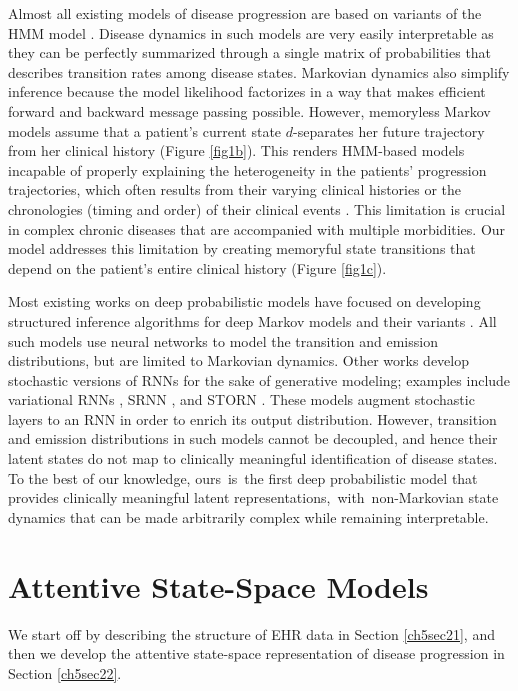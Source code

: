 \documentclass [PhD] {uclathes}
\begin{document}
Almost all existing models of disease progression are based on variants of the HMM model \cite{wang2014unsupervised,liu2015efficient,alaa2017learning}. Disease dynamics in such models are very easily interpretable as they can be perfectly summarized through a single matrix of probabilities that describes transition rates among disease states. Markovian dynamics also simplify inference because the model likelihood factorizes in a way that makes efficient forward and backward message passing possible. However, memoryless Markov models assume that a patient's current state $d$-separates her future trajectory from her clinical history (Figure \ref{fig1b}). This renders HMM-based models incapable of properly explaining the heterogeneity in the patients' progression trajectories, which often results from their varying clinical histories or the chronologies (timing and order) of their clinical events \cite{valderas2009defining}. This limitation is crucial in complex chronic diseases that are accompanied with multiple morbidities. Our model addresses this limitation by creating memoryful state transitions that depend on the patient's entire clinical history (Figure \ref{fig1c}).

Most existing works on deep probabilistic models have focused on developing structured inference algorithms for deep Markov models and their variants \cite{krishnan2017structured,dai2016recurrent,karl2016deep,johnson2016composing,rangapuram2018deep}. All such models use neural networks to model the transition and emission distributions, but are limited to Markovian dynamics. Other works develop stochastic versions of RNNs for the sake of generative modeling; examples include variational RNNs \cite{chung2015recurrent}, SRNN \cite{fraccaro2016sequential}, and STORN \cite{bayer2014learning}. These models augment stochastic layers to an RNN in order to enrich its output distribution. However, transition and emission distributions in such models cannot be decoupled, and hence their latent states do not map to clinically meaningful identification of disease states. To the best of our knowledge, ours~is~the first deep probabilistic model that provides clinically meaningful latent representations,~with~non-Markovian state dynamics that can be made arbitrarily complex while remaining interpretable.

\section{Attentive State-Space Models}
\label{ch5sec2}
We start off by describing the structure of EHR data in Section \ref{ch5sec21}, and then we develop the attentive state-space representation of disease progression in Section \ref{ch5sec22}.  
\end{document}
